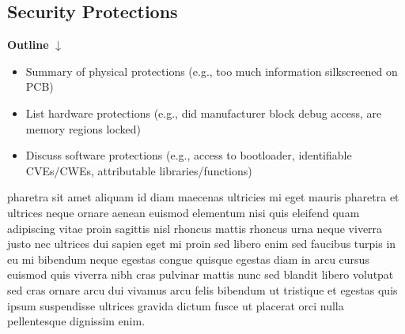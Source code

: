 \subsection{Security Protections} \label{securityprotections}

\textbf{Outline}
$\downarrow$

\begin{itemize}
    \item Summary of physical protections (e.g., too much information silkscreened on PCB)
    \item List hardware protections (e.g., did manufacturer block debug access, are memory regions locked)
    \item Discuss software protections (e.g., access to bootloader, identifiable CVEs/CWEs, attributable libraries/functions)
\end{itemize}

pharetra sit amet aliquam id diam maecenas ultricies mi eget mauris pharetra et ultrices neque ornare aenean euismod elementum nisi quis eleifend quam adipiscing vitae proin sagittis nisl rhoncus mattis rhoncus urna neque viverra justo nec ultrices dui sapien eget mi proin sed libero enim sed faucibus turpis in eu mi bibendum neque egestas congue quisque egestas diam in arcu cursus euismod quis viverra nibh cras pulvinar mattis nunc sed blandit libero volutpat sed cras ornare arcu dui vivamus arcu felis bibendum ut tristique et egestas quis ipsum suspendisse ultrices gravida dictum fusce ut placerat orci nulla pellentesque dignissim enim.

